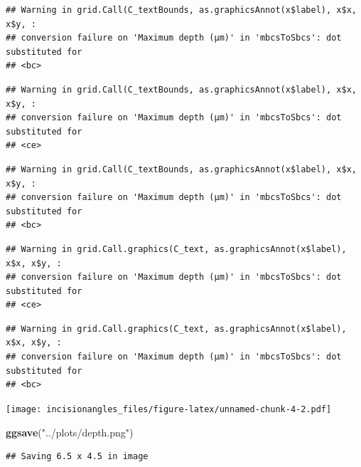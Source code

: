 \documentclass[
]{article}
\newenvironment{Shaded}{\begin{snugshade}}{\end{snugshade}}
\newcommand{\FunctionTok}[1]{\textcolor[rgb]{0.13,0.29,0.53}{\textbf{#1}}}
\newcommand{\NormalTok}[1]{#1}
\newcommand{\StringTok}[1]{\textcolor[rgb]{0.31,0.60,0.02}{#1}}
\begin{document}
\begin{verbatim}
## Warning in grid.Call(C_textBounds, as.graphicsAnnot(x$label), x$x, x$y, :
## conversion failure on 'Maximum depth (μm)' in 'mbcsToSbcs': dot substituted for
## <bc>
\end{verbatim}

\begin{verbatim}
## Warning in grid.Call(C_textBounds, as.graphicsAnnot(x$label), x$x, x$y, :
## conversion failure on 'Maximum depth (μm)' in 'mbcsToSbcs': dot substituted for
## <ce>
\end{verbatim}

\begin{verbatim}
## Warning in grid.Call(C_textBounds, as.graphicsAnnot(x$label), x$x, x$y, :
## conversion failure on 'Maximum depth (μm)' in 'mbcsToSbcs': dot substituted for
## <bc>
\end{verbatim}

\begin{verbatim}
## Warning in grid.Call.graphics(C_text, as.graphicsAnnot(x$label), x$x, x$y, :
## conversion failure on 'Maximum depth (μm)' in 'mbcsToSbcs': dot substituted for
## <ce>
\end{verbatim}

\begin{verbatim}
## Warning in grid.Call.graphics(C_text, as.graphicsAnnot(x$label), x$x, x$y, :
## conversion failure on 'Maximum depth (μm)' in 'mbcsToSbcs': dot substituted for
## <bc>
\end{verbatim}

\texttt{[image: incisionangles\_files/figure-latex/unnamed-chunk-4-2.pdf]}

\begin{Shaded}
\begin{Highlighting}[]
\FunctionTok{ggsave}\NormalTok{(}\StringTok{"../plots/depth.png"}\NormalTok{)}
\end{Highlighting}
\end{Shaded}

\begin{verbatim}
## Saving 6.5 x 4.5 in image
\end{verbatim}
\end{document}
